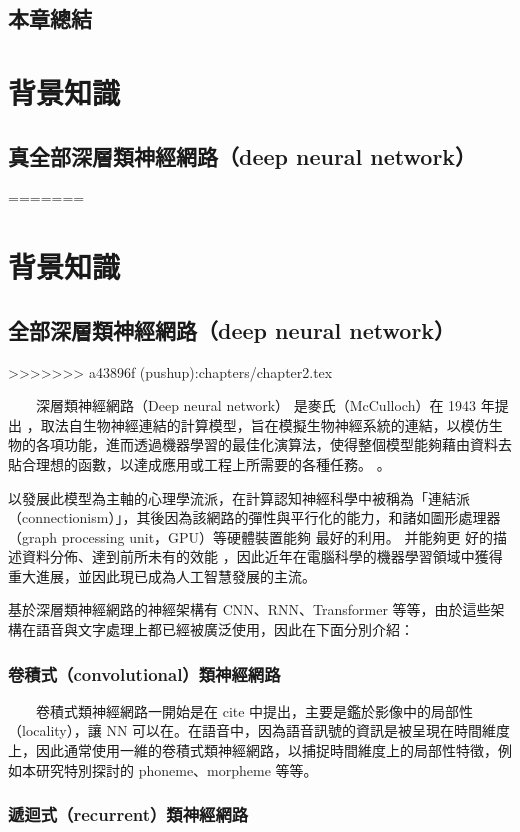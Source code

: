 \section{本章總結}

\chapter{背景知識}
\section{真全部深層類神經網路（deep neural network）}
=======
\chapter{背景知識}
\section{全部深層類神經網路（deep neural network）}
>>>>>>> a43896f (pushup):chapters/chapter2.tex

　　深層類神經網路（Deep neural network） 是麥氏（McCulloch）在 1943 年提出 \cite{mcculloch1943logical}，取法自生物神經連結的計算模型，旨在模擬生物神經系統的連結，以模仿生物的各項功能，進而透過機器學習的最佳化演算法，使得整個模型能夠藉由資料去貼合理想的函數，以達成應用或工程上所需要的各種任務。 。

    以發展此模型為主軸的心理學流派，在計算認知神經科學中被稱為「連結派（connectionism）」，其後因為該網路的彈性與平行化的能力，和諸如圖形處理器（graph processing unit，GPU）等硬體裝置能夠 最好的利用。 
    并能夠更 好的描述資料分佈、達到前所未有的效能 ，因此近年在電腦科學的機器學習領域中獲得重大進展，並因此現已成為人工智慧發展的主流。

    基於深層類神經網路的神經架構有 CNN、RNN、Transformer 等等，由於這些架構在語音與文字處理上都已經被廣泛使用，因此在下面分別介紹：

\subsection{卷積式（convolutional）類神經網路}

　　卷積式類神經網路一開始是在 cite 中提出，主要是鑑於影像中的局部性（locality），讓 NN 可以在。在語音中，因為語音訊號的資訊是被呈現在時間維度上，因此通常使用一維的卷積式類神經網路，以捕捉時間維度上的局部性特徵，例如本研究特別探討的 phoneme、morpheme 等等。

\subsection{遞迴式（recurrent）類神經網路}


